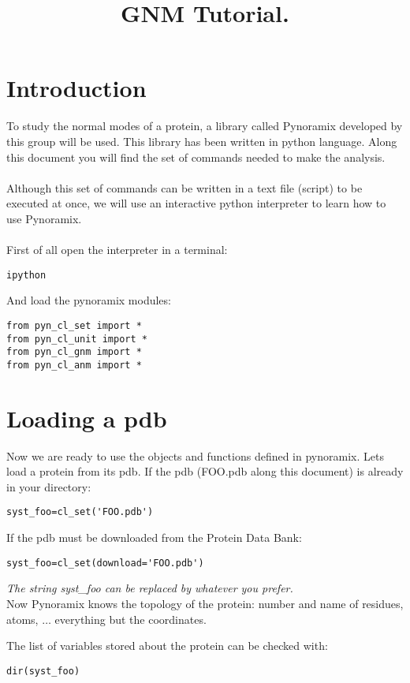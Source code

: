 \documentclass[12pt]{article}
\title{GNM Tutorial.}
\date{}
\begin{document}
\maketitle

\section*{Introduction}

To study the normal modes of a protein, a library called Pynoramix
developed by this group will be used. This library has been written in
python language. Along this document you will find the set of commands
needed to make the analysis.  \\ \\ Although this set of commands can
be written in a text file (script) to be executed at once, we will use an
interactive python interpreter to learn how to use Pynoramix.
\\ \\
First of all open the interpreter in a terminal:
\begin{verbatim}
ipython
\end{verbatim}
And load the pynoramix modules:
\begin{verbatim}
from pyn_cl_set import *
from pyn_cl_unit import *
from pyn_cl_gnm import *
from pyn_cl_anm import *
\end{verbatim}

\section*{Loading a pdb}
Now we are ready to use the objects and functions defined in
pynoramix.  Lets load a protein from its pdb. If the pdb (FOO.pdb
along this document) is already in your directory:

\begin{verbatim}
syst_foo=cl_set('FOO.pdb')
\end{verbatim}
If the pdb must be downloaded from the Protein Data Bank:
\begin{verbatim}
syst_foo=cl_set(download='FOO.pdb')
\end{verbatim}

\emph{The string syst\_foo can be replaced by whatever you prefer.}
\\

Now Pynoramix knows the topology of the protein: number and name of
residues, atoms, $\dots$ everything but the coordinates.

The list of variables stored about the protein can be checked with:
\begin{verbatim}
dir(syst_foo)
\end{verbatim}
\end{document}
